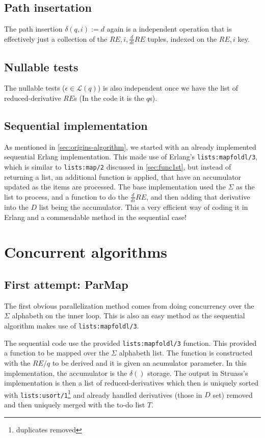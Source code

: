 \documentclass[a4paper,11pt]{report}
\begin{document}
\subsection{Path insertation}
The path insertion $\delta(q,i):=d$ again is a independent operation
that is effectively just a collection of the $RE,i,\frac{d}{di}RE$
tuples, indexed on the $RE,i$ key.

\subsection{Nullable tests}
The nullable tests ($\epsilon\in \mathcal{L}(q)$) is also independent
once we have the list of reduced-derivative $RE$s (In the code it is
the $q$s).

\subsection{Sequential implementation}

As mentioned in \ref{sec:origins-algorithm}, we started with an
already implemented sequential Erlang implementation. This made use of
Erlang's \texttt{lists:mapfoldl/3}, which is similar to
\texttt{lists:map/2} discussed in \ref{sec:func1st}, but instead of
returning a list, an additional function is applied, that have an
accumulator updated as the items are processed. The base
implementation used the $\Sigma$ as the list to process, and a
function to do the $\frac{d}{di}RE$, and then adding that derivative
into the $D$ list being the accumulator. This a very efficient way of
coding it in Erlang and a commendable method in the sequential case!

\section{Concurrent algorithms}

\subsection{First attempt: ParMap}
\label{sec:strausparmap}

The first obvious parallelization method comes from doing concurrency
over the $\Sigma$ alphabeth on the inner loop. This is also an easy method
as the sequential algorithm makes use of \texttt{lists:mapfoldl/3}.

The sequential code use the provided
\texttt{lists:mapfoldl/3} function. This provided a function to be
mapped over the $\Sigma$ alphabeth list. The function is constructed
with the $RE/q$ to be derived and it is given an acumulator
parameter. In this implementation, the accumulator is the
$\delta()$ storage. The output in Struass's implementation is then a
list of reduced-derivatives which then is uniquely sorted
with \texttt{lists:usort/1}\footnote{duplicates removed} and already
handled derivatives (those in $D$ set) removed and then uniquely
merged with the to-do list $T$.
\end{document}
